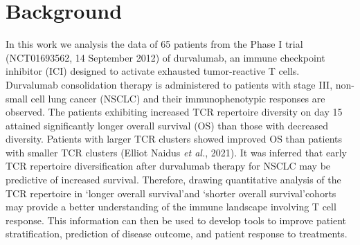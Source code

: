 \section{Background}\label{sec:background}
In this work we analysis the data of 65 patients from the Phase I trial (NCT01693562, 14 September 2012)  of durvalumab, an immune checkpoint inhibitor (ICI) designed to activate exhausted tumor-reactive T cells. Durvalumab consolidation therapy is administered to patients with stage III, non-small cell lung cancer (NSCLC) and their immunophenotypic responses are observed. The patients exhibiting increased TCR repertoire diversity on day 15 attained significantly longer overall survival (OS) than those with decreased diversity. Patients with larger TCR clusters showed improved OS than patients with smaller TCR clusters (\cite{lizhang}Elliot Naidus \textit{et al.}, 2021). It was inferred that early TCR repertoire diversification after durvalumab therapy for NSCLC may be predictive of increased survival. Therefore, drawing quantitative analysis of the TCR repertoire in \lq longer overall survival\rq and \lq shorter overall survival\rq cohorts may provide a better understanding of the immune landscape involving T cell response. This information can then be used to develop tools to improve patient stratification, prediction of disease outcome, and patient response to treatments.\par

